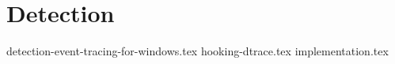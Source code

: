 \documentclass{report}
\begin{document}
\chapter{Detection}
\label{cha:detection}
{detection-event-tracing-for-windows.tex}
{hooking-dtrace.tex}
{implementation.tex}
\end{document}
